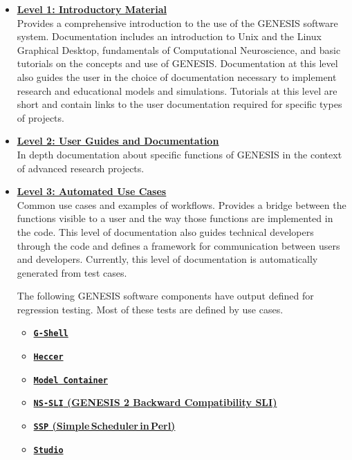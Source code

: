 \documentclass[12pt]{article}
\begin{document}
\begin{itemize}

\item[]\href{../contents-level1/contents-level1.tex}{\bf \underline{Level 1: Introductory Material}}\\
Provides a comprehensive
  introduction to the use of the GENESIS software system.
  Documentation includes an introduction to Unix and the Linux
  Graphical Desktop, fundamentals of Computational Neuroscience, and
  basic tutorials on the concepts and use of GENESIS. Documentation at
  this level also guides the user in the choice of documentation
  necessary to implement research and educational models and
  simulations.  Tutorials at this level are short and contain links to
  the user documentation required for specific types of projects.

\item[]\href{../contents-level2/contents-level2.tex}{\bf \underline{Level 2: User Guides and Documentation}}\\
 In depth
  documentation about specific functions of GENESIS in the context of
  advanced research projects.

\item[]\href{http://www.neurospaces.org/tests-menu.html}{\bf \underline{Level 3: Automated Use Cases}}\\
  Common use cases and examples
  of workflows. Provides a bridge between the functions visible to a user and
  the way those functions are implemented in the code.  This level of documentation also guides technical developers through the code and defines a
  framework for communication between users and developers.
  Currently, this level of documentation is automatically generated
  from test cases.
  
The following GENESIS software components have output defined for regression testing. Most of these tests are defined by use cases.
\begin{itemize}
\item[]\href{../tests-gshell/tests-gshell.tex}{\bf {\tt G-Shell}}
\item[]\href{../tests-heccer/tests-heccer.tex}{\bf {\tt Heccer}}
\item[]\href{../tests-model-container/model-container.tex}{\bf {\tt Model\,Container}}
\item[]\href{../tests-g2-backward-compatibility/tests-g2-backward-compatibility.tex}{\bf {\tt NS-SLI} (GENESIS 2 Backward Compatibility SLI)}
\item[]\href{../tests-ssp/tests-ssp.tex}{\bf {\tt SSP} (Simple\,Scheduler\,in\,Perl)}
\item[]\href{../tests-studio/tests-studio.tex}{\bf {\tt Studio}}
\end{itemize}
  

\end{itemize}
\end{document}
